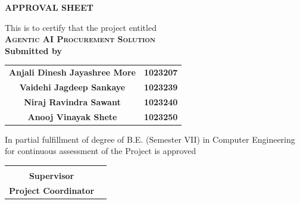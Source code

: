 
\begin{center}

{\LARGE\bf APPROVAL SHEET}

\vspace{1cm}

{\large This is to certify that the project entitled}\\[0.3cm]

{\Large\bf \textsc{Agentic AI Procurement Solution}}\\[0.3cm]

{\large\bf Submitted by}\\[0.5cm]

\begin{table}[h]
\centering
\Large
\begin{tabular}{cc}
\textbf{Anjali Dinesh Jayashree More} & \textbf{1023207} \\
\textbf{Vaidehi Jagdeep Sankaye} & \textbf{1023239} \\
\textbf{Niraj Ravindra Sawant} & \textbf{1023240} \\
\textbf{Anooj Vinayak Shete} & \textbf{1023250}
\end{tabular}
\end{table}

\vspace{1cm}


In partial fulfillment of degree of B.E. (Semester VII) in Computer Engineering for continuous assessment of the Project is approved \\[2cm]


\begin{tabular}{cc}
\begin{minipage}{0.42\textwidth}
\centering
\rule{5cm}{0.4pt}\\
\textbf{Supervisor}
\end{minipage}
&
\begin{minipage}{0.42\textwidth}
\centering
\rule{5cm}{0.4pt}\\
\textbf{Project Coordinator}
\end{minipage}
\end{tabular}

\vspace{2.2cm}



\end{center}
